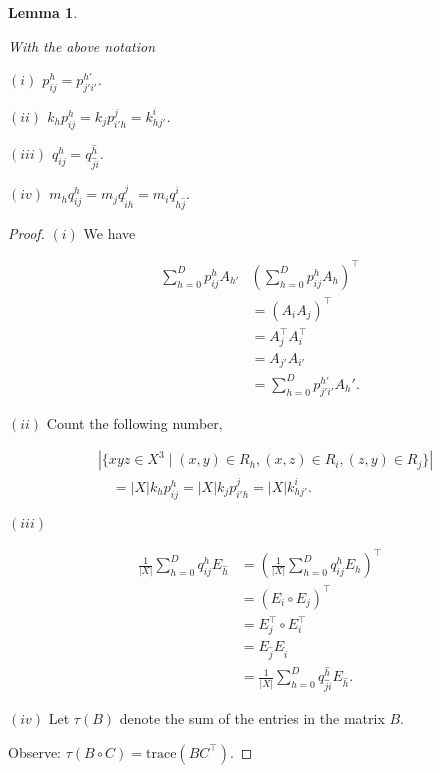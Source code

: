 \documentclass[
]{book}
\newtheorem{lemma}{Lemma}[chapter]
\theoremstyle{definition}
\theoremstyle{definition}
\theoremstyle{definition}
\theoremstyle{definition}
\theoremstyle{remark}
\begin{document}
\begin{lemma}
\protect\hypertarget{lem:phijqhij}{}\label{lem:phijqhij}

With the above notation

\((i)\) \(p^h_{ij} = p^{h'}_{j'i'}\).

\((ii)\) \(k_hp^h_{ij} = k_jp^j_{i'h} = k^i_{hj'}\).

\((iii)\) \(q^h_{ij} = q^{\hat{h}}_{\hat{j}\hat{i}}\).

\((iv)\) \(m_hq^h_{ij} = m_jq^j_{\hat{i}h} = m_iq^i_{h\hat{j}}.\)

\end{lemma}

\begin{proof}
\leavevmode

\((i)\) We have

\begin{align}
\sum_{h = 0}^D p^h_{ij} A_{h'} & \left(\sum_{h=0}^D p^h_{ij}A_h\right)^\top \\
 & = (A_iA_j)^\top  \\
& = A_j^\top A_i^\top\\
& = A_{j'}A_{i'} \\
& = \sum_{h=0}^D p^{h'}_{j'i'}A_h'.
\end{align}

\((ii)\) Count the following number,

\begin{align} 
& |\{xyz\in X^3 \mid (x,y)\in R_h, (x,z)\in R_i, (z,y)\in R_j\}| \\
& \quad =  |X|k_hp^h_{ij} = |X|k_jp^j_{i'h} = |X|k^i_{hj'}.
\end{align}

\((iii)\)

\begin{align}
\frac{1}{|X|}\sum_{h = 0}^D q^h_{ij} E_{\hat{h}} & = \left(\frac{1}{|X|}\sum_{h=0}^D q^h_{ij}E_h\right)^\top \\
 & = (E_i\circ E_j)^\top  \\
& = E_j^\top \circ E_i^\top\\
& = E_{\hat{j}}E_{\hat{i}} \\
& = \frac{1}{|X|}\sum_{h=0}^D q^{\hat{h}}_{\hat{j}\hat{i}}E_{\hat{h}}.
\end{align}

\((iv)\) Let \(\tau(B)\) denote the sum of the entries in the matrix \(B\).

Observe: \(\tau(B\circ C) = \mathrm{trace}(BC^\top)\).


\end{proof}
\end{document}
